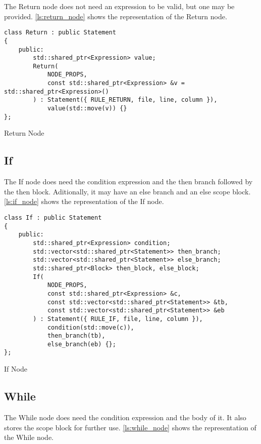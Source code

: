 The Return node does not need an expression to be valid, but one may be provided.
\autoref{ls:return_node} shows the representation of the Return node.

\begin{listing}[H]
\begin{verbatim}
class Return : public Statement
{
    public:
        std::shared_ptr<Expression> value;
        Return(
            NODE_PROPS,
            const std::shared_ptr<Expression> &v = std::shared_ptr<Expression>()
        ) : Statement({ RULE_RETURN, file, line, column }),
            value(std::move(v)) {}
};
\end{verbatim}
\caption{Return Node}
\label{ls:return_node}
\end{listing}

\subsection{If}

The If node does need the condition expression and the then branch followed by the then block.
Aditionally, it may have an else branch and an else scope block.
\autoref{ls:if_node} shows the representation of the If node.

\begin{listing}[H]
\begin{verbatim}
class If : public Statement
{
    public:
        std::shared_ptr<Expression> condition;
        std::vector<std::shared_ptr<Statement>> then_branch;
        std::vector<std::shared_ptr<Statement>> else_branch;
        std::shared_ptr<Block> then_block, else_block;
        If(
            NODE_PROPS,
            const std::shared_ptr<Expression> &c,
            const std::vector<std::shared_ptr<Statement>> &tb,
            const std::vector<std::shared_ptr<Statement>> &eb
        ) : Statement({ RULE_IF, file, line, column }),
            condition(std::move(c)),
            then_branch(tb),
            else_branch(eb) {};
};
\end{verbatim}
\caption{If Node}
\label{ls:if_node}
\end{listing}

\subsection{While}

The While node does need the condition expression and the body of it.
It also stores the scope block for further use.
\autoref{ls:while_node} shows the representation of the While node.

